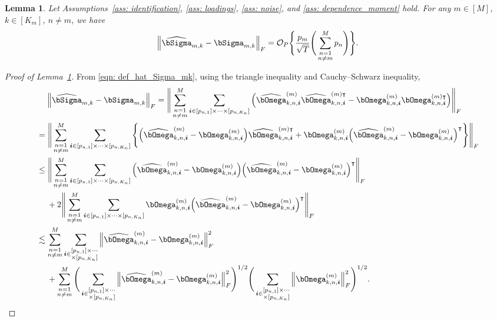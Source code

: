 \documentclass[aos]{imsart}
\theoremstyle{plain}
\newtheorem{lemma}[theorem]{Lemma}
\theoremstyle{definition}
\def\wh#1{\widehat{#1}}
\def\cO{\mathcal{O}}
\def\bi{\boldsymbol{i}}
\def\trans{\intercal}
\begin{document}
\begin{lemma}\label{lemma: rate_Sigma}
Let Assumptions~\ref{ass: identification}, \ref{ass: loadings}, \ref{ass: noise}, and \ref{ass: dependence_moment} hold. For any $m\in[M]$, $k\in[K_m]$, $n\neq m$, we have
\begin{align*}
    \Big\| \wh\bSigma_{m,k} -\bSigma_{m,k} \Big\|_F
    = \cO_P\Bigg\{ \frac{p_m}{\sqrt{T}} \Bigg( \sum_{\substack{n=1\\ n\neq m}}^M p_n \Bigg) \Bigg\} .
\end{align*}
\end{lemma}


\begin{proof}[Proof of Lemma~\ref{lemma: rate_Sigma}]
From \eqref{eqn: def_hat_Sigma_mk}, using the triangle inequality and Cauchy--Schwarz inequality,
\begin{align}
    &\;\quad
    \Big\| \wh\bSigma_{m,k} -\bSigma_{m,k} \Big\|_F = \Bigg\| \sum_{\substack{n=1\\ n\neq m}}^M \sum_{\bi \in [p_{n,1}] \times \cdots \times[p_{n,K_n}]} \Big( \wh\bOmega_{k,n,\bi}^{(m)} \wh\bOmega_{k,n,\bi}^{(m) \trans} - \bOmega_{k,n,\bi}^{(m)} \bOmega_{k,n,\bi}^{(m) \trans} \Big) \Bigg\|_F \notag \\
    &=
    \Bigg\| \sum_{\substack{n=1\\ n\neq m}}^M \sum_{\bi \in [p_{n,1}] \times \cdots \times[p_{n,K_n}]} \Bigg\{ \Big( \wh\bOmega_{k,n,\bi}^{(m)} - \bOmega_{k,n,\bi}^{(m)} \Big) \wh\bOmega_{k,n,\bi}^{(m) \trans} + \bOmega_{k,n,\bi}^{(m)} \Big( \wh\bOmega_{k,n,\bi}^{(m)} - \bOmega_{k,n,\bi}^{(m)} \Big)^\trans \Bigg\} \Bigg\|_F \notag \\
    &\leq
    \Bigg\| \sum_{\substack{n=1\\ n\neq m}}^M \sum_{\bi \in [p_{n,1}] \times \cdots \times[p_{n,K_n}]} \Big( \wh\bOmega_{k,n,\bi}^{(m)} - \bOmega_{k,n,\bi}^{(m)} \Big) \Big( \wh\bOmega_{k,n,\bi}^{(m)} - \bOmega_{k,n,\bi}^{(m)} \Big)^\trans \Bigg\|_F \notag \\
    &\;\quad
    + 2\Bigg\| \sum_{\substack{n=1\\ n\neq m}}^M \sum_{\bi \in [p_{n,1}] \times \cdots \times[p_{n,K_n}]} \bOmega_{k,n,\bi}^{(m)} \Big( \wh\bOmega_{k,n,\bi}^{(m)} - \bOmega_{k,n,\bi}^{(m)} \Big)^\trans \Bigg\|_F \notag \\
    &\lesssim
    \sum_{\substack{n=1\\ n\neq m}}^M \sum_{\bi \in \substack{[p_{n,1}] \times \cdots\\ \times[p_{n,K_n}] }} \Big\| \wh\bOmega_{k,n,\bi}^{(m)} - \bOmega_{k,n,\bi}^{(m)} \Big\|_F^2 \notag \\
    &\;\quad
    + \sum_{\substack{n=1\\ n\neq m}}^M \Bigg( \sum_{\bi \in \substack{[p_{n,1}] \times \cdots\\ \times[p_{n,K_n}] }} \Big\| \wh\bOmega_{k,n,\bi}^{(m)} - \bOmega_{k,n,\bi}^{(m)} \Big\|_F^2 \Bigg)^{1/2} \Bigg( \sum_{\bi \in \substack{[p_{n,1}] \times \cdots\\ \times[p_{n,K_n}] }} \Big\| \bOmega_{k,n,\bi}^{(m)} \Big\|_F^2 \Bigg)^{1/2} .
    \label{eqn: whSigma_minus_Sigma_rate}
\end{align}


\end{proof}
\end{document}
